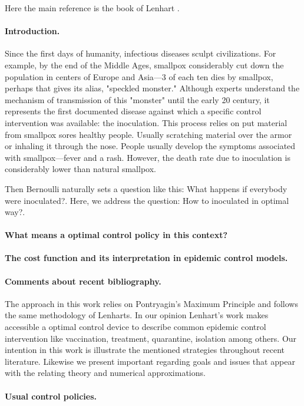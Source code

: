 Here the main reference is the book of Lenhart 
\cite{Lenhart2002}.
\paragraph{Introduction.}
  Since the first days of humanity, infectious diseases sculpt civilizations. 
For example, by the end of the Middle Ages, smallpox considerably cut down the 
population in centers of Europe and Asia---3 of  each ten dies by smallpox, 
perhaps that gives its alias, "speckled monster."  Although experts understand
the mechanism of transmission of this  "monster" until the early 20  century, it
represents the first documented disease
\citep[][]{bernoulli1760essai, bradley1971smallpox, Foppa2017}
against which a specific control intervention was available: the inoculation.
This process relies on put material from smallpox sores healthy people. Usually
scratching material over the armor or inhaling it through the nose. People
usually develop the symptoms associated with smallpox---fever and a rash.
However, the death rate due to inoculation is considerably lower than natural
smallpox.

  Then Bernoulli naturally sets a question like this: What happens
if everybody were inoculated?. Here, we address the question: How to 
inoculated in optimal way?.

\paragraph{What means a optimal control policy in this context?}

\paragraph{The cost function and its interpretation in epidemic control models.}

\paragraph{Comments about recent bibliography.}
    The approach in this work relies on Pontryagin’s Maximum Principle
\cite{} and follows the same methodology of Lenharts.
In our opinion Lenhart's work makes accessible a optimal control device to
describe common epidemic control intervention like vaccination, treatment, 
quarantine, isolation among others. Our intention in this work is illustrate 
the mentioned strategies throughout recent literature. Likewise we present 
important regarding goals and issues that appear with the relating theory and 
numerical approximations.
\paragraph{Usual control policies.}
